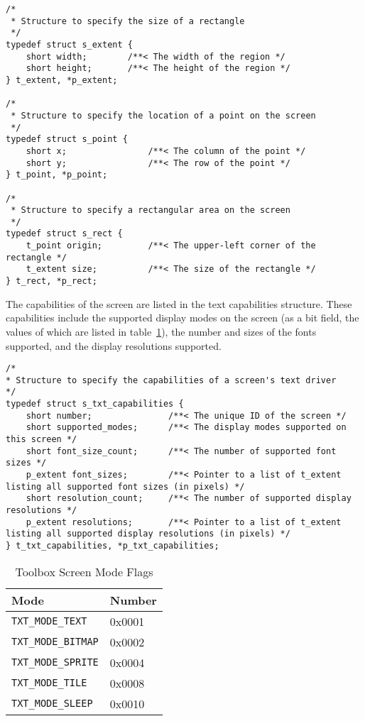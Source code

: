 \begin{lstlisting}
/*
 * Structure to specify the size of a rectangle
 */
typedef struct s_extent {
    short width;        /**< The width of the region */
    short height;       /**< The height of the region */
} t_extent, *p_extent;

/*
 * Structure to specify the location of a point on the screen
 */
typedef struct s_point {
    short x;                /**< The column of the point */
    short y;                /**< The row of the point */
} t_point, *p_point;

/*
 * Structure to specify a rectangular area on the screen
 */
typedef struct s_rect {
    t_point origin;         /**< The upper-left corner of the rectangle */
    t_extent size;          /**< The size of the rectangle */
} t_rect, *p_rect;
\end{lstlisting}

The capabilities of the screen are listed in the text capabilities structure.
These capabilities include the supported display modes on the screen (as a bit field, the values of which are listed in table~\ref{tbl:fnx_screen_modes}),
the number and sizes of the fonts supported, and the display resolutions supported.

\begin{lstlisting}
/*
* Structure to specify the capabilities of a screen's text driver
*/
typedef struct s_txt_capabilities {
    short number;               /**< The unique ID of the screen */
    short supported_modes;      /**< The display modes supported on this screen */
    short font_size_count;      /**< The number of supported font sizes */
    p_extent font_sizes;        /**< Pointer to a list of t_extent listing all supported font sizes (in pixels) */
    short resolution_count;     /**< The number of supported display resolutions */
    p_extent resolutions;       /**< Pointer to a list of t_extent listing all supported display resolutions (in pixels) */
} t_txt_capabilities, *p_txt_capabilities;
\end{lstlisting}

\begin{table}
	\begin{center}
		\begin{tabular}{|l|l|} \hline
			Mode & Number \\ \hline\hline
			\verb+TXT_MODE_TEXT+ & 0x0001 \\ \hline
			\verb+TXT_MODE_BITMAP+ & 0x0002 \\ \hline
			\verb+TXT_MODE_SPRITE+ & 0x0004 \\ \hline
			\verb+TXT_MODE_TILE+ & 0x0008 \\ \hline
			\verb+TXT_MODE_SLEEP+ & 0x0010 \\ \hline
		\end{tabular}
	\end{center}
	\caption{Toolbox Screen Mode Flags}
	\label{tbl:fnx_screen_modes}
\end{table}

